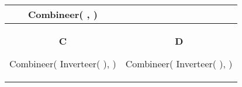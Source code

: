 \documentclass[12pt, a4paper]{article}
\begin{document}
\begin{minipage}{\textwidth}
\begin{table}[H]
\begin{tabulary}{\linewidth}{|C|C|}
					Combineer(  ,  ) \vspace{0.1cm}
					\\ \hline
					\textbf{C}
					
					Combineer( Inverteer( \digit{0} ),  ) \vspace{0.1cm}
					&
					\textbf{D}
					
					Combineer( Inverteer(  ),  ) \vspace{0.1cm}
					\\ \hline 
				\end{tabulary}
			\end{table}
	\end{minipage} \\ \\
	
\end{document}
